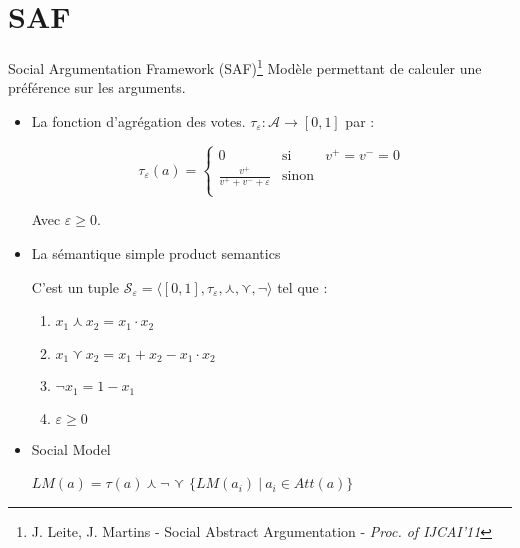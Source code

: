 \documentclass{beamer}
\begin{document}
  \section{SAF}

  \begin{frame}{Social Argumentation Framework (SAF)\footnote{J. Leite, J. Martins - Social Abstract Argumentation - \emph{Proc. of IJCAI’11}}}
    Modèle permettant de calculer une préférence sur les arguments.

    \begin{itemize}
      \item La fonction d'agrégation des votes.
      $\tau_\varepsilon : \mathcal{A} \rightarrow [0, 1]$ par :

      $$
      \tau_\varepsilon(a) = \left\{
          \begin{array}{lll}
            0 & \mbox{si } & v^+ = v^- = 0\\
            \frac{v^+}{v^+ + v^- + \varepsilon} & \mbox{sinon} & \\
          \end{array}\right.$$

        Avec $\varepsilon \geq 0$.

      \item La sémantique simple product semantics

      C'est un tuple $\mathcal{S}_\varepsilon = \langle [0, 1], \tau_\varepsilon, \curlywedge, \curlyvee, \neg  \rangle$ tel que :
      \begin{enumerate}
        \item $x_1 \curlywedge x_2 = x_1 \cdot x_2$
        \item $x_1 \curlyvee x_2 = x_1 + x_2 - x_1 \cdot x_2$
        \item $\neg x_1 = 1 - x_1$
        \item $\varepsilon \geq 0$
      \end{enumerate}

      \item Social Model

      $LM(a) = \tau(a) \curlywedge \neg$ {\Large $\curlyvee$} $\{LM(a_i)\ |\ a_i \in Att(a)\}$
    \end{itemize}
  \end{frame}
\end{document}
